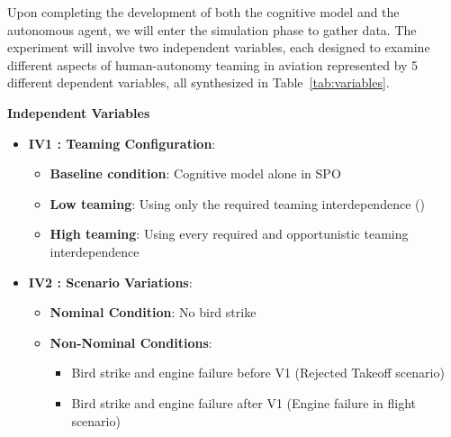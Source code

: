 \documentclass[12pt,a4paper]{article} %
\begin{document}
	Upon completing the development of both the cognitive model and the autonomous agent, we will enter the simulation phase to gather data. The experiment will involve two independent variables, each designed to examine different aspects of human-autonomy teaming in aviation represented by 5 different dependent variables, all synthesized in Table~\ref{tab:variables}.
	
	\textbf{Independent Variables}
	\begin{itemize}
	\item \textbf{IV1 : Teaming Configuration}:
	\begin{itemize}
	\item \textbf{Baseline condition}: Cognitive model alone in SPO
	\item \textbf{Low teaming}: Using only the required teaming interdependence ()
	\item \textbf{High teaming}: Using every required and opportunistic teaming interdependence
	\end{itemize}
	\item \textbf{IV2 : Scenario Variations}:
	\begin{itemize}
	\item \textbf{Nominal Condition}: No bird strike
	\item \textbf{Non-Nominal Conditions}:
	\begin{itemize}
	\item Bird strike and engine failure before V1 (Rejected Takeoff scenario)
	\item Bird strike and engine failure after V1 (Engine failure in flight scenario)
	\end{itemize}
	\end{itemize}
	\end{itemize}
	
\end{document}
